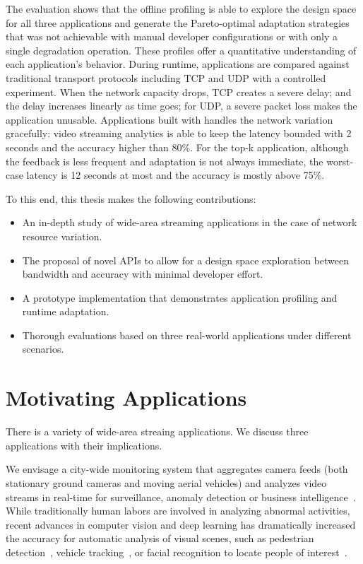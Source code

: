 The evaluation shows that the offline profiling is able to explore the design
space for all three applications and generate the Pareto-optimal adaptation
strategies that was not achievable with manual developer configurations or with
only a single degradation operation. These profiles offer a quantitative
understanding of each application's behavior. During runtime, \sysname{}
applications are compared against traditional transport protocols including TCP
and UDP with a controlled experiment. When the network capacity drops, TCP
creates a severe delay; and the delay increases linearly as time goes; for UDP,
a severe packet loss makes the application unusable. Applications built with
\sysname{} handles the network variation gracefully: video streaming analytics
is able to keep the latency bounded with 2 seconds and the accuracy higher than
80\%. For the top-k application, although the feedback is less frequent and
adaptation is not always immediate, the worst-case latency is 12 seconds at most
and the accuracy is mostly above 75\%.

To this end, this thesis makes the following contributions:

\begin{itemize}
\item An in-depth study of wide-area streaming applications in the case of
  network resource variation.
\item The proposal of novel APIs to allow for a design space exploration between
  bandwidth and accuracy with minimal developer effort.
\item A prototype implementation that demonstrates application profiling and
  runtime adaptation.
\item Thorough evaluations based on three real-world applications under
  different scenarios.
\end{itemize}

\section{Motivating Applications}
\label{sec:motiv-appl}

There is a variety of wide-area streaing applications. We discuss three
applications with their implications.

 We envisage a city-wide monitoring system that
aggregates camera feeds (both stationary ground cameras and moving aerial
vehicles) and analyzes video streams in real-time for surveillance, anomaly
detection or business intelligence~\cite{oh2011large}. While traditionally human
labors are involved in analyzing abnormal activities, recent advances in
computer vision and deep learning has dramatically increased the accuracy for
automatic analysis of visual scenes, such as pedestrian
detection~\cite{dollar2012pedestrian}, vehicle tracking~\cite{coifman1998real},
or facial recognition to locate people of
interest~\cite{Lu:2015:SHF:2888116.2888245, parkhi2015deep}.


